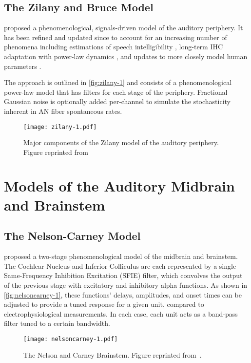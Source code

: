 \subsection{The Zilany and Bruce Model} %
\label{sub:the_zilany_and_bruce_model}
\cite{Zilany2006Modeling} proposed a phenomenological, signals-driven model of the auditory periphery.  It has been refined and updated since to account for an increasing number of phenomena including estimations of speech intelligibility \citep{Zilany2007Predictions}, long-term IHC adaptation with power-law dynamics \citep{Zilany2009Phenomenological}, and updates to more closely model human parameters \citep{Zilany2014Updated}.  

The approach is outlined in \autoref{fig:zilany-1} and consists of a phenomenological power-law model that has filters for each stage of the periphery.  Fractional Gaussian noise is optionally added per-channel to simulate the stochasticity inherent in AN fiber spontaneous rates. 

\begin{figure}[htbp]
	\centering
	\texttt{[image: zilany-1.pdf]}
	\caption[The Zilany Model]{Major components of the Zilany model of the auditory periphery.  Figure reprinted from~\cite{Zilany2009Phenomenological}}
	\label{fig:zilany-1}
\end{figure}
\section{Models of the Auditory Midbrain and Brainstem} %
\label{sec:models_of_the_auditory_midbrain_and_brainstem}
\subsection{The Nelson-Carney Model} %
\label{sub:the_nelson_carney_model}
\cite{Nelson2004Phenomenological} proposed a two-stage phenomenological model of the midbrain and brainstem.  The Cochlear Nucleus and Inferior Colliculus are each represented by a single Same-Frequency Inhibition Excitation (SFIE) filter, which convolves the output of the previous stage with  excitatory and inhibitory alpha functions.  As shown in \autoref{fig:nelsoncarney-1}, these functions' delays, amplitudes, and onset times can be adjusted to provide a tuned response for a given unit, compared to electrophysiological measurements.  In each case, each unit acts as a band-pass filter tuned to a certain bandwidth. 
\begin{figure}[htbp]
	\centering
	\texttt{[image: nelsoncarney-1.pdf]}
	\caption[The Nelson and Carney Model]{The Nelson and Carney Brainstem. Figure reprinted from~\cite{Nelson2004Phenomenological}.}
	\label{fig:nelsoncarney-1}
\end{figure}

